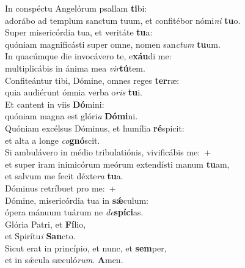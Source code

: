 \evenverse In conspéctu Angelórum psallam \textbf{ti}bi:~\*\\
\evenverse adorábo ad templum sanctum tuum, et confitébor nómi\textit{ni} \textbf{tu}o.\\
\oddverse Super misericórdia tua, et veritáte \textbf{tu}a:~\*\\
\oddverse quóniam magnificásti super omne, nomen san\textit{ctum} \textbf{tu}um.\\
\evenverse In quacúmque die invocávero te, e\textbf{xáu}di me:~\*\\
\evenverse multiplicábis in ánima mea \textit{vir}\textbf{tú}tem.\\
\oddverse Confiteántur tibi, Dómine, omnes reges \textbf{ter}ræ:~\*\\
\oddverse quia audiérunt ómnia verba o\textit{ris} \textbf{tu}i.\\
\evenverse Et cantent in viis \textbf{Dó}mini:~\*\\
\evenverse quóniam magna est glóri\textit{a} \textbf{Dó}\textbf{mi}ni.\\
\oddverse Quóniam excélsus Dóminus, et humília \textbf{ré}spicit:~\*\\
\oddverse et alta a longe \textit{co}\textbf{gnó}scit.\\
\evenverse Si ambulávero in médio tribulatiónis, vivificábis me:~+\\
\evenverse  et super iram inimicórum meórum extendísti manum \textbf{tu}am,~\*\\
\evenverse et salvum me fecit déxte\textit{ra} \textbf{tu}a.\\
\oddverse Dóminus retríbuet pro me:~+\\
\oddverse  Dómine, misericórdia tua in \textbf{sǽ}culum:~\*\\
\oddverse ópera mánuum tuárum ne \textit{de}\textbf{spí}\textbf{ci}as.\\
\evenverse Glória Patri, et \textbf{Fí}lio,~\*\\
\evenverse et Spirítu\textit{i} \textbf{San}cto.\\
\oddverse Sicut erat in princípio, et nunc, et \textbf{sem}per,~\*\\
\oddverse et in sǽcula sæculó\textit{rum}. \textbf{A}men.\\
